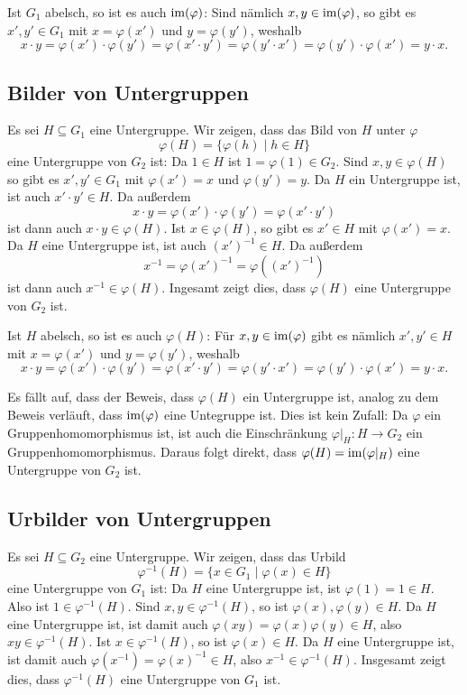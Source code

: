 Ist $G_1$ abelsch, so ist es auch $\mathrm{im}(\varphi)$: Sind nämlich $x, y \in \mathrm{im}(\varphi)$, so gibt es $x', y' \in G_1$ mit $x = \varphi(x')$ und $y = \varphi(y')$, weshalb
\[
 x \cdot y
 = \varphi(x') \cdot \varphi(y')
 = \varphi(x' \cdot y')
 = \varphi(y' \cdot x')
 = \varphi(y') \cdot \varphi(x')
 = y \cdot x.
\]




\subsection{Bilder von Untergruppen}
Es sei $H \subseteq G_1$ eine Untergruppe. Wir zeigen, dass das Bild von $H$ unter $\varphi$
\[
 \varphi(H) = \{\varphi(h) \mid h \in H\}
\]
eine Untergruppe von $G_2$ ist: Da $1 \in H$ ist $1 = \varphi(1) \in G_2$. Sind $x,y \in \varphi(H)$ so gibt es $x', y' \in G_1$ mit $\varphi(x') = x$ und $\varphi(y') = y$. Da $H$ ein Untergruppe ist, ist auch $x' \cdot y' \in H$. Da außerdem
\[
 x \cdot y
 = \varphi(x') \cdot \varphi(y')
 = \varphi(x' \cdot y')
\]
ist dann auch $x \cdot y \in \varphi(H)$. Ist $x \in \varphi(H)$, so gibt es $x' \in H$ mit $\varphi(x') = x$. Da $H$ eine Untergruppe ist, ist auch $(x')^{-1} \in H$. Da außerdem
\[
 x^{-1}
 = \varphi(x')^{-1}
 = \varphi((x')^{-1})
\]
ist dann auch $x^{-1} \in \varphi(H)$. Ingesamt zeigt dies, dass $\varphi(H)$ eine Untergruppe von $G_2$ ist.

Ist $H$ abelsch, so ist es auch $\varphi(H)$: Für $x,y \in \mathrm{im}(\varphi)$ gibt es nämlich $x', y' \in H$ mit $x = \varphi(x')$ und $y = \varphi(y')$, weshalb
\[
 x \cdot y
 = \varphi(x') \cdot \varphi(y')
 = \varphi(x' \cdot y')
 = \varphi(y' \cdot x')
 = \varphi(y') \cdot \varphi(x')
 = y \cdot x.
\]


\begin{bem}
 Es fällt auf, dass der Beweis, dass $\varphi(H)$ ein Untergruppe ist, analog zu dem Beweis verläuft, dass $\mathrm{im}(\varphi)$ eine Untegruppe ist. Dies ist kein Zufall: Da $\varphi$ ein Gruppenhomomorphismus ist, ist auch die Einschränkung $\varphi|_H \colon H \to G_2$ ein Gruppenhomomorphismus. Daraus folgt direkt, dass $\varphi(H) = \mathrm{im}(\varphi|_H)$ eine Untergruppe von $G_2$ ist.
\end{bem}



\subsection{Urbilder von Untergruppen}
Es sei $H \subseteq G_2$ eine Untergruppe. Wir zeigen, dass das Urbild
\[
 \varphi^{-1}(H) = \{x \in G_1 \mid \varphi(x) \in H\}
\]
eine Untergruppe von $G_1$ ist: Da $H$ eine Untergruppe ist, ist $\varphi(1) = 1 \in H$. Also ist $1 \in \varphi^{-1}(H)$. Sind $x,y \in \varphi^{-1}(H)$, so ist $\varphi(x), \varphi(y) \in H$. Da $H$ eine Untergruppe ist, ist damit auch $\varphi(xy) = \varphi(x)\varphi(y) \in H$, also $xy \in \varphi^{-1}(H)$. Ist $x \in \varphi^{-1}(H)$, so ist $\varphi(x) \in H$. Da $H$ eine Untergruppe ist, ist damit auch $\varphi(x^{-1}) = \varphi(x)^{-1} \in H$, also $x^{-1} \in \varphi^{-1}(H)$. Insgesamt zeigt dies, dass $\varphi^{-1}(H)$ eine Untergruppe von $G_1$ ist.


